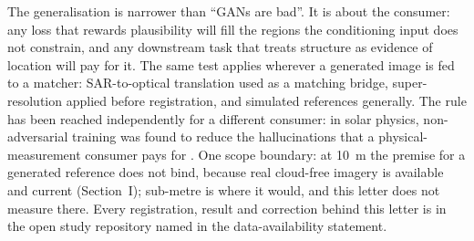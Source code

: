 The generalisation is narrower than ``GANs are bad''. It is about the consumer: any loss that rewards
plausibility will fill the regions the conditioning input does not constrain, and any
downstream task that treats structure as evidence of location will pay for it. The same
test applies wherever a generated image is fed to a matcher: SAR-to-optical translation
used as a matching bridge, super-resolution applied before registration, and simulated
references generally. The rule has been reached independently for a different consumer:
in solar physics, non-adversarial training was found to reduce the hallucinations that a
physical-measurement consumer pays for \cite{sayez2025mitigating}. One scope boundary: at 10~m the premise for a generated reference
does not bind, because real cloud-free imagery is available and current (Section~I);
sub-metre is where it would, and this letter does not measure there. Every registration,
result and correction behind this letter is in the open study repository named in the
data-availability statement.
